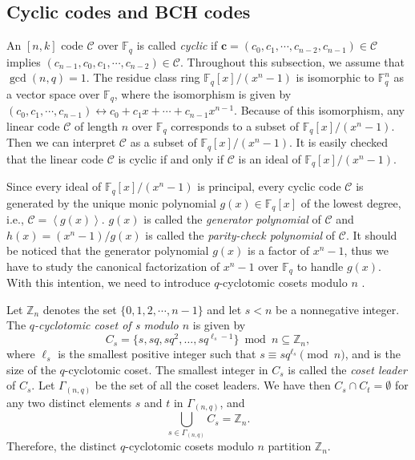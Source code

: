 \documentclass[10pt]{article}%
\begin{document}
	\subsection{Cyclic codes and BCH codes}\label{sec2.1}
	
	An $[n,k]$ code $\mathcal{C}$ over $\mathbb{F}_q$ is called \textit{cyclic} if $\mathbf{c}=(c_0,c_1,\cdots,c_{n-2},c_{n-1})\in\mathcal{C}$ implies $(c_{n-1},c_0,c_1,\cdots,c_{n-2})\in\mathcal{C}$. Throughout this subsection, we assume that $\gcd(n,q)=1$. The residue class ring $\mathbb{F}_q[x]/(x^n-1)$ is isomorphic to $\mathbb{F}_q^n$ as a vector space over $\mathbb{F}_q$, where the isomorphism is given by $(c_0,c_1,\cdots,c_{n-1})\leftrightarrow c_0+c_1x+\cdots+c_{n-1}x^{n-1}$. Because of this isomorphism, any linear code $\mathcal{C}$ of length $n$ over $\mathbb{F}_q$ corresponds to a subset of $\mathbb{F}_q[x]/(x^n-1)$. Then we can interpret $\mathcal{C}$ as a subset of $\mathbb{F}_q[x]/(x^n-1)$. It is easily checked that the linear code $\mathcal{C}$ is cyclic if and only if $\mathcal{C}$ is an ideal of $\mathbb{F}_q[x]/(x^n-1)$.
	
	Since every ideal of $\mathbb{F}_q[x]/(x^n-1)$ is principal, every cyclic code $\mathcal{C}$ is generated by the unique monic polynomial $g(x)\in\mathbb{F}_q[x]$ of the lowest degree, i.e., $\mathcal{C}=\left<g(x)\right>$. $g(x)$ is called the \textit{generator polynomial} of $\mathcal{C}$ and $h(x)=(x^n-1)/g(x)$ is called the \textit{parity-check polynomial} of $\mathcal{C}$. It should be noticed that the generator polynomial $g(x)$ is a factor of $x^n-1$, thus we have to study the canonical factorization of $x^n-1$ over $\mathbb{F}_q$ to handle $g(x)$. With this intention, we need to introduce $q$-cyclotomic cosets modulo $n$ \cite{Ding2014CodesDifferenceSetsa}.
	
	Let $\mathbb{Z}_n$ denotes the set $\{0,1,2,\cdots,n-1\}$ and let $s<n$ be a nonnegative integer. The \textit{$q$-cyclotomic coset of s modulo $n$} is given by 
	\begin{equation}\label{sec2.1 equ1}
		C_s=\{s,sq,sq^2,\ldots,sq^{\ell_s-1}\}\bmod n\subseteq\mathbb{Z}_n,
	\end{equation}
	where $\ell_s$ is the smallest positive integer such that $s \equiv sq^{\ell_s} \pmod n$, and is the size of the $q$-cyclotomic coset. The smallest integer in $C_s$ is called the \textit{coset leader} of $C_s$. Let $\Gamma_{(n,q)}$ be the set of all the coset leaders. We have then $C_s \cap C_t = \emptyset$ for any two distinct elements $s$ and $t$ in $\Gamma_{(n,q)}$, and
	\begin{equation}\label{sec2.1 equ2}
		\bigcup_{s\in\Gamma_{(n,q)}}C_s=\mathbb{Z}_n.
	\end{equation}
	Therefore, the distinct $q$-cyclotomic cosets modulo $n$ partition $\mathbb{Z}_n$. 
		
\end{document}
